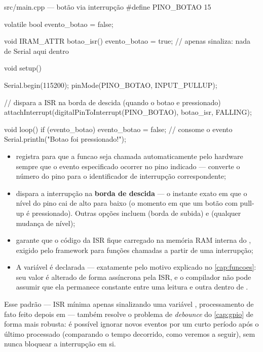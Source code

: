 \begin{codigoc}{src/main.cpp — botão via interrupção}
#define PINO_BOTAO 15

volatile bool evento_botao = false;

void IRAM_ATTR botao_isr() {
    evento_botao = true;   // apenas sinaliza: nada de Serial aqui dentro
}

void setup() {
    Serial.begin(115200);
    pinMode(PINO_BOTAO, INPUT_PULLUP);

    // dispara a ISR na borda de descida (quando o botao e pressionado)
    attachInterrupt(digitalPinToInterrupt(PINO_BOTAO), botao_isr, FALLING);
}

void loop() {
    if (evento_botao) {
        evento_botao = false;   // consome o evento
        Serial.println("Botao foi pressionado!");
    }
}
\end{codigoc}

\begin{itemize}
    \item {} registra  para que a funcao seja chamada automaticamente pelo hardware sempre que o evento especificado ocorrer no pino indicado —  converte o número do pino para o identificador de interrupção correspondente;
    \item {} dispara a interrupção na \textbf{borda de descida} — o instante exato em que o nível do pino cai de alto para baixo (o momento em que um botão com pull-up é pressionado). Outras opções incluem  (borda de subida) e  (qualquer mudança de nível);
    \item {} garante que o código da ISR fique carregado na memória RAM interna do \ESP{}, exigido pelo framework para funções chamadas a partir de uma interrupção;
    \item A variável  é declarada  — exatamente pelo motivo explicado no \cref{cap:funcoes}: seu valor é alterado de forma assíncrona pela ISR, e o compilador não pode assumir que ela permanece constante entre uma leitura e outra dentro de .
\end{itemize}

\begin{dica}
Esse padrão — ISR mínima apenas sinalizando uma variável , processamento de fato feito depois em  — também resolve o problema de \emph{debounce} do \cref{cap:gpio} de forma mais robusta: é possível ignorar novos eventos por um curto período após o último processado (comparando o tempo decorrido, como veremos a seguir), sem nunca bloquear a interrupção em si.
\end{dica}

